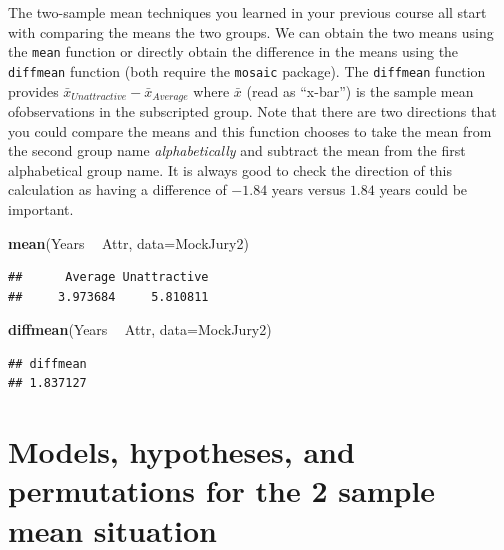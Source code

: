 \documentclass[]{book}
\newenvironment{Shaded}{\begin{snugshade}}{\end{snugshade}}
\newcommand{\KeywordTok}[1]{\textcolor[rgb]{0.13,0.29,0.53}{\textbf{#1}}}
\newcommand{\DataTypeTok}[1]{\textcolor[rgb]{0.13,0.29,0.53}{#1}}
\newcommand{\StringTok}[1]{\textcolor[rgb]{0.31,0.60,0.02}{#1}}
\newcommand{\OperatorTok}[1]{\textcolor[rgb]{0.81,0.36,0.00}{\textbf{#1}}}
\newcommand{\NormalTok}[1]{#1}
\begin{document}
The two-sample mean techniques you learned in your previous course all
start with comparing the means the two groups. We can obtain the two
means using the \texttt{mean} function or directly obtain the difference
in the means using the \texttt{diffmean} function (both require the
\texttt{mosaic} package). The \texttt{diffmean} function provides
\(\bar{x}_{Unattractive} - \bar{x}_{Average}\) where \(\bar{x}\) (read
as ``x-bar'') is the sample mean ofobservations in the subscripted
group. Note that there are two directions that you could compare the
means and this function chooses to take the mean from the second group
name \emph{alphabetically} and subtract the mean from the first
alphabetical group name. It is always good to check the direction of
this calculation as having a difference of \(-1.84\) years versus
\(1.84\) years could be important.

\begin{Shaded}
\begin{Highlighting}[]
\KeywordTok{mean}\NormalTok{(Years }\OperatorTok{~}\StringTok{ }\NormalTok{Attr, }\DataTypeTok{data=}\NormalTok{MockJury2)}
\end{Highlighting}
\end{Shaded}

\begin{verbatim}
##      Average Unattractive 
##     3.973684     5.810811
\end{verbatim}

\begin{Shaded}
\begin{Highlighting}[]
\KeywordTok{diffmean}\NormalTok{(Years }\OperatorTok{~}\StringTok{ }\NormalTok{Attr, }\DataTypeTok{data=}\NormalTok{MockJury2)}
\end{Highlighting}
\end{Shaded}

\begin{verbatim}
## diffmean 
## 1.837127
\end{verbatim}

\section{Models, hypotheses, and permutations for the 2 sample mean
situation}\label{section2-3}
\end{document}
